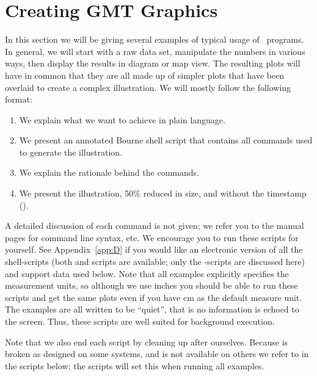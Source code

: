 %
%
\chapter{Creating GMT Graphics}
\label{ch:7}
\thispagestyle{headings}

In this section we will be giving several examples of
typical usage of \GMT\ programs.  In general, we will
start with a raw data set, manipulate the numbers in
various ways, then display the results in diagram or
map view.  The resulting plots will have in common that
they are all made up of simpler plots that have been
overlaid to create a complex illustration.  We will
mostly follow the following format:

\begin{enumerate}
\item We explain what we want to achieve in plain
language.

\item We present an annotated Bourne shell script that contains
all commands used to generate the illustration.

\item We explain the rationale behind the commands.

\item We present the illustration, 50\% reduced in size, and without
the timestamp ().
\end{enumerate}

A detailed discussion of each command is not given;
we refer you to the manual pages for command line
syntax, etc.  We encourage you to run these scripts for yourself.
See Appendix~\ref{app:D} if you would like an electronic version
of all the shell-scripts (both  and  scripts
are available; only the -scripts are discussed here) and support
data used below.  Note that all examples explicitly specifies the
measurement units, so although we use inches you should be able
to run these scripts and get the same plots even if you have cm
as the default measure unit.  The examples are all written to be ``quiet'',
that is no information is echoed to the screen.  Thus,
these scripts are well suited for background execution.

Note that we also end each script by cleaning up after
ourselves. Because  is broken as designed on some
systems, and  is not available on others we refer
to  in the scripts below; the 
scripts will set this when running all examples. 

